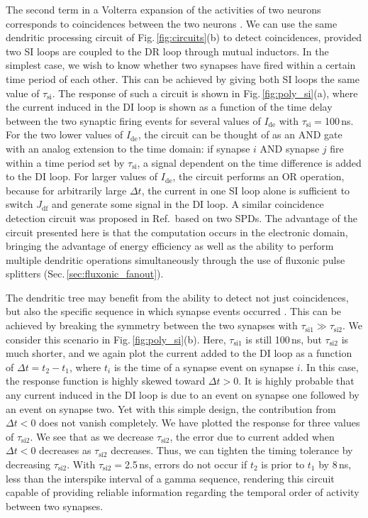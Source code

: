 \documentclass[twocolumn]{article}
\newcommand{\onlinecite}[1]{\hspace{-1 ex} \nocite{#1}\citenum{#1}}
\begin{document}
The second term in a Volterra expansion of the activities of two neurons corresponds to coincidences between the two neurons \cite{geki2002}. We can use the same dendritic processing circuit of Fig.\,\ref{fig:circuits}(b) to detect coincidences, provided two SI loops are coupled to the DR loop through mutual inductors. In the simplest case, we wish to know whether two synapses have fired within a certain time period of each other. This can be achieved by giving both SI loops the same value of $\tau_{\mathrm{si}}$. The response of such a circuit is shown in Fig.\,\ref{fig:poly_si}(a), where the current induced in the DI loop is shown as a function of the time delay between the two synaptic firing events for several values of $I_{\mathrm{de}}$ with $\tau_{\mathrm{si}} =$100\,ns. For the two lower values of $I_{\mathrm{de}}$, the circuit can be thought of as an AND gate with an analog extension to the time domain: if synapse $i$ AND synapse $j$ fire within a time period set by $\tau_{\mathrm{si}}$, a signal dependent on the time difference is added to the DI loop. For larger values of $I_{\mathrm{de}}$, the circuit performs an OR operation, because for arbitrarily large $\Delta t$, the current in one SI loop alone is sufficient to switch $J_{\mathrm{df}}$ and generate some signal in the DI loop. A similar coincidence detection circuit was proposed in Ref.\,\onlinecite{sh2018_full} based on two SPDs. The advantage of the circuit presented here is that the computation occurs in the electronic domain, bringing the advantage of energy efficiency as well as the ability to perform multiple dendritic operations simultaneously through the use of fluxonic pulse splitters (Sec.\,\ref{sec:fluxonic_fanout}).

The dendritic tree may benefit from the ability to detect not just coincidences, but also the specific sequence in which synapse events occurred \cite{haah2015}. This can be achieved by breaking the symmetry between the two synapses with $\tau_{\mathrm{si1}} \gg \tau_{\mathrm{si2}}$. We consider this scenario in Fig.\,\ref{fig:poly_si}(b). Here, $\tau_{\mathrm{si1}}$ is still 100\,ns, but $\tau_{\mathrm{si2}}$ is much shorter, and we again plot the current added to the DI loop as a function of $\Delta t = t_2-t_1$, where $t_i$ is the time of a synapse event on synapse $i$. In this case, the response function is highly skewed toward $\Delta t > 0$. It is highly probable that any current induced in the DI loop is due to an event on synapse one followed by an event on synapse two. Yet with this simple design, the contribution from $\Delta t < 0$ does not vanish completely. We have plotted the response for three values of $\tau_{\mathrm{si2}}$. We see that as we decrease $\tau_{\mathrm{si2}}$, the error due to current added when $\Delta t < 0$ decreases as $\tau_{\mathrm{si2}}$ decreases. Thus, we can tighten the timing tolerance by decreasing $\tau_{\mathrm{si2}}$. With $\tau_{\mathrm{si2}} = $2.5\,ns, errors do not occur if $t_2$ is prior to $t_1$ by 8\,ns, less than the interspike interval of a gamma sequence, rendering this circuit capable of providing reliable information regarding the temporal order of activity between two synapses.
\end{document}
